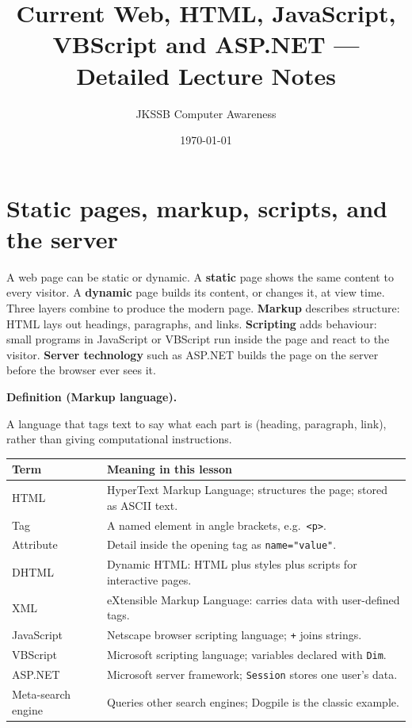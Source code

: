 \documentclass[11pt]{article}
\title{Current Web, HTML, JavaScript, VBScript and ASP.NET --- Detailed Lecture Notes}
\author{JKSSB Computer Awareness}
\date{\today}
\newenvironment{definitionbox}[1]{%
  \par\noindent\textbf{Definition (#1).}\ \itshape
}{\par\vspace{0.3em}}
\begin{document}
\maketitle

\section{Static pages, markup, scripts, and the server}
A web page can be static or dynamic. A \textbf{static} page shows the same content to every visitor. A \textbf{dynamic} page builds its content, or changes it, at view time. Three layers combine to produce the modern page. \textbf{Markup} describes structure: HTML lays out headings, paragraphs, and links. \textbf{Scripting} adds behaviour: small programs in JavaScript or VBScript run inside the page and react to the visitor. \textbf{Server technology} such as ASP.NET builds the page on the server before the browser ever sees it.

\begin{definitionbox}{Markup language}
A language that tags text to say what each part is (heading, paragraph, link), rather than giving computational instructions.
\end{definitionbox}

\begin{center}
\begin{tabular}{p{}p{}}
\toprule
\textbf{Term} & \textbf{Meaning in this lesson} \\
\midrule
HTML & HyperText Markup Language; structures the page; stored as ASCII text. \\
Tag & A named element in angle brackets, e.g.\ \texttt{<p>}. \\
Attribute & Detail inside the opening tag as \texttt{name="value"}. \\
DHTML & Dynamic HTML: HTML plus styles plus scripts for interactive pages. \\
XML & eXtensible Markup Language: carries data with user-defined tags. \\
JavaScript & Netscape browser scripting language; \texttt{+} joins strings. \\
VBScript & Microsoft scripting language; variables declared with \texttt{Dim}. \\
ASP.NET & Microsoft server framework; \texttt{Session} stores one user's data. \\
Meta-search engine & Queries other search engines; Dogpile is the classic example. \\
\bottomrule
\end{tabular}
\end{center}
\end{document}
